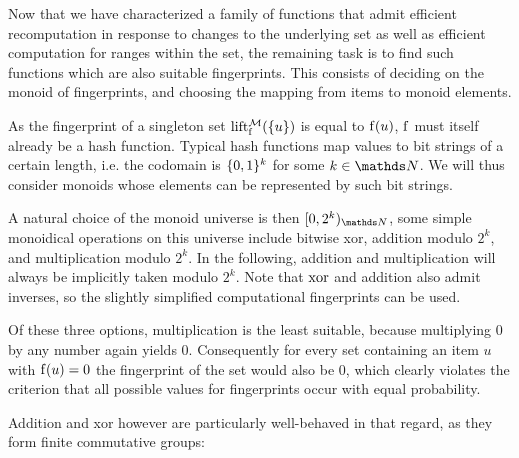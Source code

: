 Now that we have characterized a family of functions that admit efficient recomputation in response to changes to the underlying set as well as efficient computation for ranges within the set, the remaining task is to find such functions which are also suitable fingerprints. This consists of deciding on the monoid of fingerprints, and choosing the mapping from items to monoid elements.

As the fingerprint of a singleton set $\operatorname{lift_{\operatorname{f}}^{\mathcal{M}}}(\{u\})$ is equal to $\operatorname{f}(u)$, $\operatorname{f}$ must itself already be a hash function. Typical hash functions map values to bit strings of a certain length, i.e. the codomain is $\{0, 1\}^k$ for some $k \in \N$. We will thus consider monoids whose elements can be represented by such bit strings.

A natural choice of the monoid universe is then $\range{0}{2^k}{\N}$, some simple monoidical operations on this universe include bitwise xor, addition modulo $2^k$, and multiplication modulo $2^k$. In the following, addition and multiplication will always be implicitly taken modulo $2^k$. Note that $\operatorname{xor}$ and addition also admit inverses, so the slightly simplified computational fingerprints can be used.

Of these three options, multiplication is the least suitable, because multiplying $0$ by any number again yields $0$. Consequently for every set containing an item $u$ with $\operatorname{f}(u) = 0$ the fingerprint of the set would also be $0$, which clearly violates the criterion that all possible values for fingerprints occur with equal probability.

Addition and xor however are particularly well-behaved in that regard, as they form finite commutative groups:

